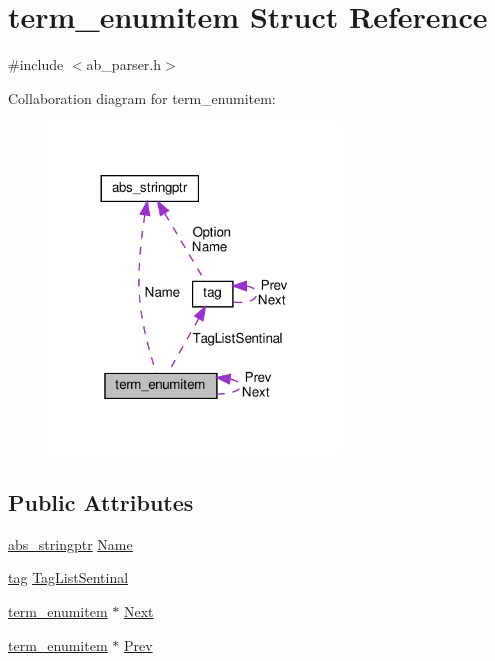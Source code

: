 \hypertarget{structterm__enumitem}{}\section{term\+\_\+enumitem Struct Reference}
\label{structterm__enumitem}


{\ttfamily \#include $<$ab\+\_\+parser.\+h$>$}



Collaboration diagram for term\+\_\+enumitem\+:\nopagebreak
\begin{figure}[H]
\begin{center}
\leavevmode
\includegraphics[width=221pt]{dc/def/structterm__enumitem__coll__graph}
\end{center}
\end{figure}
\subsection*{Public Attributes}
\begin{DoxyCompactItemize}
\item 
\hyperlink{structabs__stringptr}{abs\+\_\+stringptr} \hyperlink{structterm__enumitem_a0e4d6c8b5e13dc1a983acfad9479248b}{Name}
\item 
\hyperlink{structtag}{tag} \hyperlink{structterm__enumitem_ace61cab8da4a090548e03c7a9970deb1}{Tag\+List\+Sentinal}
\item 
\hyperlink{structterm__enumitem}{term\+\_\+enumitem} $\ast$ \hyperlink{structterm__enumitem_a76a5df14c05395f4737800d06c23611a}{Next}
\item 
\hyperlink{structterm__enumitem}{term\+\_\+enumitem} $\ast$ \hyperlink{structterm__enumitem_a9841d521b128ff1d85936bdfded2e425}{Prev}
\end{DoxyCompactItemize}


